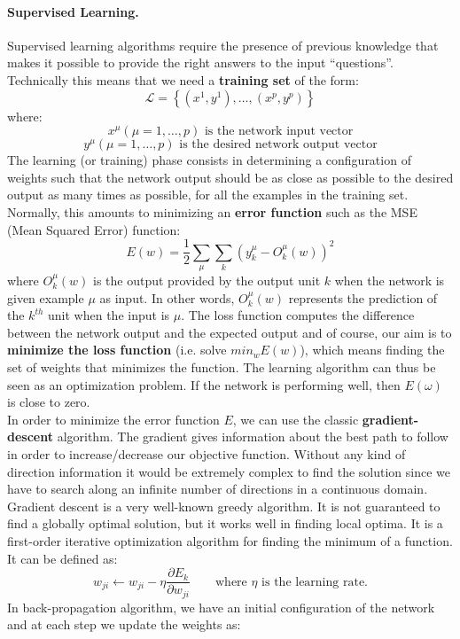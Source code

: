 \paragraph*{Supervised Learning.} Supervised learning algorithms require the presence of previous knowledge that makes it possible to provide the right answers to the input ``questions''. Technically this means that we need a \textbf{training set} of the form:
$$\mathcal{L} =\left\{\left(x^1, y^1 \right), \dots , \left(x^p, y ^p \right) \right\}$$
where:
$$x^\mu (\mu=1,\dots, p) \text{ is the network input vector}$$
$$y^\mu (\mu=1,\dots, p) \text{ is the desired network output vector}$$
The learning (or training) phase consists in determining a configuration of weights such that the network output should be as close as possible to the desired output as many times as possible, for all the examples in the training set. Normally, this amounts to minimizing an \textbf{error function} such as the MSE (Mean Squared Error) function:
$$E(w) = \frac{1}{2} \sum_{\mu} \sum_{k} \left(y_k^\mu - O_k^\mu(w)\right)^2$$
where $O_k^\mu(w)$ is the output provided by the output unit $k$ when the network is given example $\mu$ as input. In other words, $O_k^\mu(w)$ represents the prediction of the $k^{th}$ unit when the input is $\mu$. The loss function computes the difference between the network output and the expected output and of course, our aim is to \textbf{minimize the loss function} (i.e. solve $min_w E(w)$), which means finding the set of weights that minimizes the function. The learning algorithm can thus be seen as an optimization problem. If the network is performing well, then $E(\omega)$ is close to zero.\\
In order to minimize the error function $E$, we can use the classic \textbf{gradient-descent} algorithm. The gradient gives information about the best path to follow in order to increase/decrease our objective function. Without any kind of direction information it would be extremely complex to find the solution since we have to search along an infinite number of directions in a continuous domain. Gradient descent is a very well-known greedy algorithm. It is not guaranteed to find a globally optimal solution, but it works well in finding local optima. It is a first-order iterative optimization algorithm for finding the minimum of a function. It can be defined as:
$$w_{ji} \leftarrow w_{ji} - \eta \frac{\partial E_k}{\partial w_{ji}} \qquad \text{where } \eta \text{ is the learning rate.}$$
In back-propagation algorithm, we have an initial configuration of the network and at each step we update the weights as:
